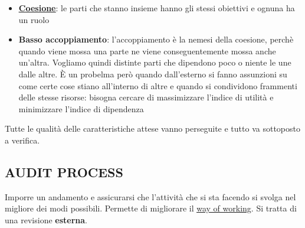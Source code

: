 \begin{itemize}
			\item \textbf{\underline{\hyperref[coeso]{Coesione}}}: le parti che stanno insieme hanno gli stessi obiettivi e ognuna ha un ruolo
			\item \textbf{Basso accoppiamento}: l'accoppiamento è la nemesi della coesione, perchè quando viene mossa una parte ne viene conseguentemente mossa anche un'altra. Vogliamo quindi distinte parti che dipendono poco o niente le une dalle altre. È un probelma  però quando dall'esterno si fanno assunzioni su come certe cose stiano all'interno di altre e quando si condividono frammenti delle stesse risorse: bisogna cercare di massimizzare l'indice di utilità e minimizzare l'indice di dipendenza
		\end{itemize}
		Tutte le qualità delle caratteristiche attese vanno perseguite e %
		tutto va sottoposto a verifica.

		\subsection{AUDIT PROCESS}  \label{audit}
		Imporre un andamento e assicurarsi che l'attività che si sta facendo si svolga nel migliore dei modi possibili. Permette di migliorare il \underline{\hyperref[way]{way of working}}. Si tratta di una revisione \textbf{esterna}.
